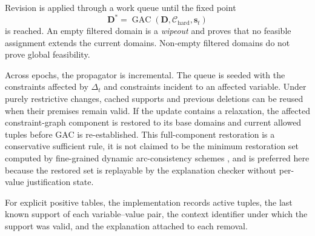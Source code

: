 \documentclass[pdflatex,sn-mathphys-num,iicol,oneside]{sn-jnl}
\newcommand{\gac}{\textsc{GAC}\xspace}
\begin{document}
Revision is applied through a work queue until the fixed point
\begin{equation}
\bm{D}^{*}
=
\operatorname{GAC}
\left(
\bm{D},
\mathcal{C}_{\mathrm{hard}},
\bm{s}_t
\right)
\end{equation}
is reached. An empty filtered domain is a \emph{wipeout} and proves
that no feasible assignment extends the current domains. Non-empty
filtered domains do not prove global feasibility.

Across epochs, the propagator is incremental. The queue is seeded
with the constraints affected by $\Delta_t$ and constraints incident
to an affected variable. Under purely restrictive changes, cached
supports and previous deletions can be reused when their premises
remain valid. If the update contains a relaxation, the affected
constraint-graph component is restored to its base domains and
current allowed tuples before \gac is re-established. This
full-component restoration is a conservative sufficient rule, it is
not claimed to be the minimum restoration set computed by
fine-grained dynamic arc-consistency schemes
\cite{bessiere1991dynamic,berlandier1994acdc,debruyne1996dnac6}, and
is preferred here because the restored set is replayable by the
explanation checker without per-value justification state.

For explicit positive tables, the implementation records active
tuples, the last known support of each variable--value pair, the
context identifier under which the support was valid, and the
explanation attached to each removal.
\end{document}
